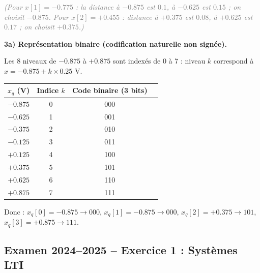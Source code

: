 \documentclass[12pt,a4paper]{article}
\newcommand{\explication}[1]{\textit{\textcolor{gray}{(#1)}}}
\begin{document}
\begin{tcolorbox}[corrbox, title=Correction Problème 1]
\explication{Pour $x[1]=-0.775$ : la distance à $-0.875$ est $0.1$, à $-0.625$ est $0.15$ ; on choisit $-0.875$.
Pour $x[2]=+0.455$ : distance à $+0.375$ est $0.08$, à $+0.625$ est $0.17$ ; on choisit $+0.375$.}

\bigskip
\textbf{3a) Représentation binaire (codification naturelle non signée).}

Les 8 niveaux de $-0.875$ à $+0.875$ sont indexés de 0 à 7 :
niveau $k$ correspond à $x = -0.875 + k \times 0.25$ V.

\begin{center}
\renewcommand{\arraystretch}{1.3}
\begin{tabular}{@{}cccc@{}}
\toprule
$x_q$ (V) & Indice $k$ & Code binaire (3 bits) \\
\midrule
$-0.875$ & 0 & 000 \\
$-0.625$ & 1 & 001 \\
$-0.375$ & 2 & 010 \\
$-0.125$ & 3 & 011 \\
$+0.125$ & 4 & 100 \\
$+0.375$ & 5 & 101 \\
$+0.625$ & 6 & 110 \\
$+0.875$ & 7 & 111 \\
\bottomrule
\end{tabular}
\end{center}

Donc :
$x_q[0] = -0.875 \to 000$,\;
$x_q[1] = -0.875 \to 000$,\;
$x_q[2] = +0.375 \to 101$,\;
$x_q[3] = +0.875 \to 111$.
\end{tcolorbox}

\subsection{Examen 2024--2025 -- Exercice 1 : Systèmes LTI}
\end{document}
